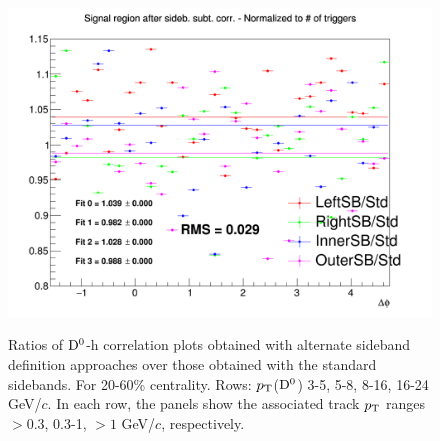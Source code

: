 \begin{figure}
{\includegraphics[width=0.31\linewidth]{figuresVsCent/Dzero/SystSideb/2060/Ratio_AzimCorrDistr_Dzero_Canvas_PtIntBins12to12_PoolInt_thr1to99.png}} \\
 \caption{Ratios of ${\rm D^0}$-h correlation plots obtained with alternate sideband definition approaches over those obtained with the standard sidebands. For 20-60\% centrality. Rows: $p_{\rm T}$(${\rm D^0}$) 3-5, 5-8, 8-16, 16-24 GeV/$c$. In each row, the panels show the associated track
$p_{\rm T}$ ranges $> 0.3$, 0.3-1, $> 1$ GeV/$c$, respectively.}
\label{fig:SysBkg2060}
\end{figure}


